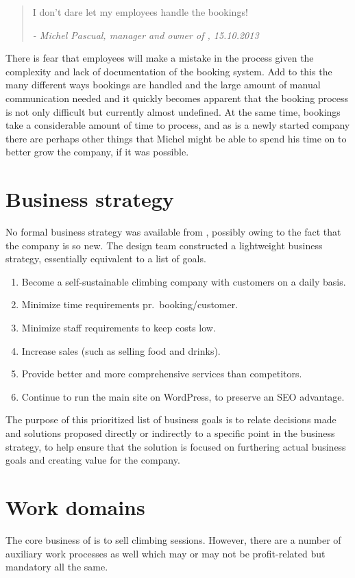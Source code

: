 \begin{quotation}
I don't dare let my employees handle the bookings!

\em - Michel Pascual, manager and owner of \gomonkey{}, 15.10.2013
\end{quotation}

There is fear that employees will make a mistake in the process given the
complexity and lack of documentation of the booking system. Add to this the many
different ways bookings are handled and the large amount of manual communication
needed and it quickly becomes apparent that the booking process is not only
difficult but currently almost undefined. At the same time, bookings take a
considerable amount of time to process, and as \gomonkey{} is a newly started
company there are perhaps other things that Michel might be able to spend his
time on to better grow the company, if it was possible.

\section{Business strategy}
No formal business strategy was available from \gomonkey{}, possibly owing to
the fact that the company is so new. The design team constructed a lightweight
business strategy, essentially equivalent to a list of goals.

\begin{enumerate}
	\item Become a self-sustainable climbing company with customers on a daily basis.
	\item Minimize time requirements pr.\ booking/customer.
	\item Minimize staff requirements to keep costs low.
	\item Increase sales (such as selling food and drinks).
	\item Provide better and more comprehensive services than competitors.
    \item Continue to run the main site on WordPress, to preserve an SEO
        advantage.
\end{enumerate}

The purpose of this prioritized list of business goals is to relate decisions
made and solutions proposed directly or indirectly to a specific point in the
business strategy, to help ensure that the solution is focused on furthering
actual business goals and creating value for the company.

\section{Work domains}
The core business of \gomonkey{} is to sell climbing sessions. However, there
are a number of auxiliary work processes as well which may or may not be profit-related
but mandatory all the same. 


